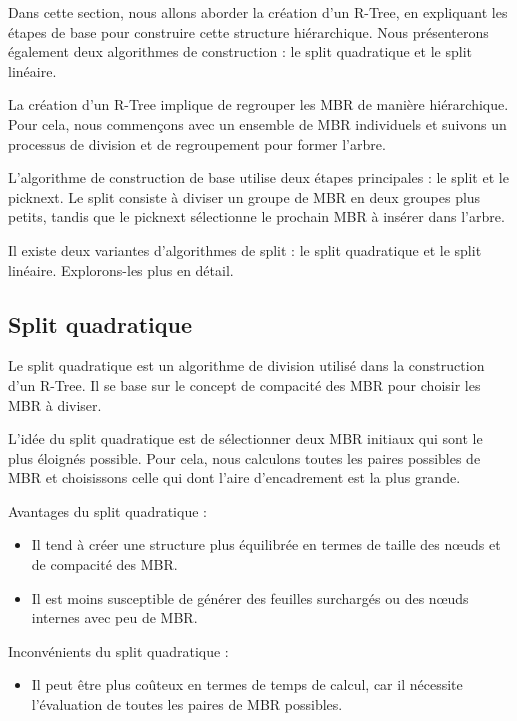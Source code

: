 \documentclass {article}
\begin{document}
Dans cette section, nous allons aborder la création d'un R-Tree, en expliquant les étapes de base
pour construire cette structure hiérarchique.
Nous présenterons également deux algorithmes de construction :
le split quadratique et le split linéaire.

La création d'un R-Tree implique de regrouper les MBR de manière hiérarchique.
Pour cela, nous commençons avec un ensemble de MBR individuels et suivons un processus
de division et de regroupement pour former l'arbre.

L'algorithme de construction de base utilise deux étapes principales : le split et le picknext.
Le split consiste à diviser un groupe de MBR en deux groupes plus petits,
tandis que le picknext sélectionne le prochain MBR à insérer dans l'arbre.

Il existe deux variantes d'algorithmes de split : le split quadratique et le split linéaire.
Explorons-les plus en détail.


\subsection {Split quadratique}
Le split quadratique est un algorithme de division utilisé dans la construction d'un R-Tree.
Il se base sur le concept de compacité des MBR pour choisir les MBR à diviser.

L'idée du split quadratique est de sélectionner deux MBR initiaux qui sont le plus éloignés possible.
Pour cela, nous calculons toutes les paires possibles de MBR et choisissons celle qui dont
l'aire d'encadrement est la plus grande.

Avantages du split quadratique :

\begin{itemize}
    \item Il tend à créer une structure plus équilibrée en termes de taille des nœuds et de
	compacité des MBR.
    \item Il est moins susceptible de générer des feuilles surchargés ou des nœuds internes
	avec peu de MBR.

\end{itemize}
Inconvénients du split quadratique :

\begin{itemize}
    \item Il peut être plus coûteux en termes de temps de calcul, car il nécessite l'évaluation
	de toutes les paires de MBR possibles.
\end{itemize}
\end{document}
